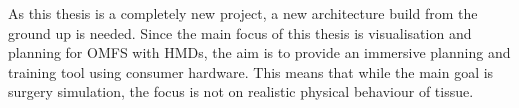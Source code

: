As this thesis is a completely new project, a new architecture build from the ground up is needed.
Since the main focus of this thesis is visualisation and planning for OMFS with HMDs, the aim is to provide an immersive planning and training tool using consumer hardware.
This means that while the main goal is surgery simulation, the focus is not on realistic physical behaviour of tissue.